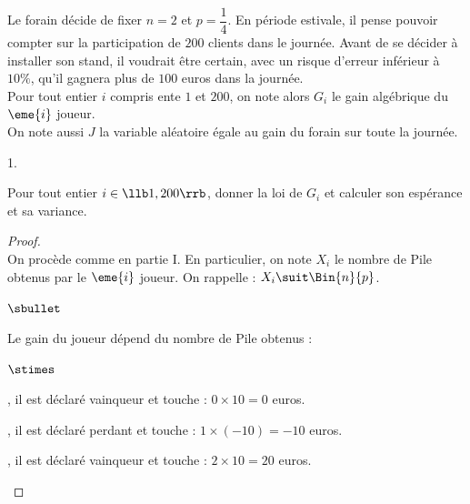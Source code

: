 \documentclass[11pt]{article}%
\begin{document}
\noindent
Le forain décide de fixer $n = 2$ et $p = \dfrac{1}{4}$. En période
estivale, il pense pouvoir compter sur la participation de $200$
clients dans le journée. Avant de se décider à installer son stand, il
voudrait être certain, avec un risque d'erreur inférieur à $10 \%$,
qu'il gagnera plus de $100$ euros dans la journée.\\
Pour tout entier $i$ compris ente $1$ et $200$, on note alors $G_{i}$
le gain algébrique du $\eme{i}$ joueur.\\
On note aussi $J$ la variable aléatoire égale au gain du forain sur
toute la journée.
\begin{noliste}{1.}
  \setlength{\itemsep}{4mm}
\item Pour tout entier $i \in \llb 1,200 \rrb$, donner la loi de
  $G_{i}$ et calculer son espérance et sa variance.
  
  \begin{proof}~\\%
    On procède comme en partie I. En particulier, on note $X_i$ le
    nombre de Pile obtenus par le $\eme{i}$ joueur. On rappelle : $X_i
    \suit \Bin{n}{p}$.
    \begin{noliste}{$\sbullet$}
    \item Le gain du joueur dépend du nombre de Pile obtenus : 
      \begin{noliste}{$\stimes$}
      \item {}, il est déclaré
        vainqueur et touche : $0 \times 10 = 0$ euros.

      \item {}, il est déclaré
        perdant et touche : $1 \times (-10) = -10$ euros.

      \item {}, il est déclaré
        vainqueur et touche : $2 \times 10 = 20$ euros.
      \end{noliste}


\end{noliste}
\end{proof}
\end{noliste}
\end{document}
